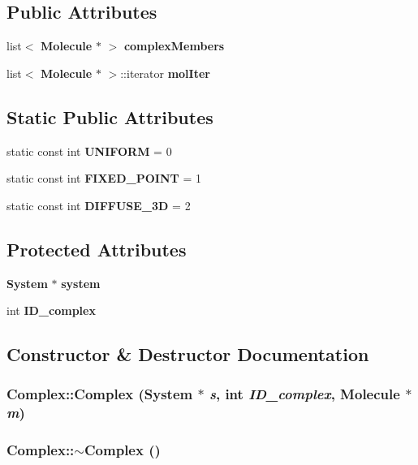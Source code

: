\subsection*{Public Attributes}
\begin{CompactItemize}
\item 
list$<$ {\bf Molecule} $\ast$ $>$ {\bf complexMembers}
\item 
list$<$ {\bf Molecule} $\ast$ $>$::iterator {\bf molIter}
\end{CompactItemize}
\subsection*{Static Public Attributes}
\begin{CompactItemize}
\item 
static const int {\bf UNIFORM} = 0
\item 
static const int {\bf FIXED\_\-POINT} = 1
\item 
static const int {\bf DIFFUSE\_\-3D} = 2
\end{CompactItemize}
\subsection*{Protected Attributes}
\begin{CompactItemize}
\item 
{\bf System} $\ast$ {\bf system}
\item 
int {\bf ID\_\-complex}
\end{CompactItemize}


\subsection{Constructor \& Destructor Documentation}
\subsubsection{\setlength{\rightskip}{0pt plus 5cm}Complex::Complex ({\bf System} $\ast$ {\em s}, int {\em ID\_\-complex}, {\bf Molecule} $\ast$ {\em m})}\label{classNFcore_1_1Complex_f21fb570112128eaf141081404504a67}


\subsubsection{\setlength{\rightskip}{0pt plus 5cm}Complex::$\sim$Complex ()}\label{classNFcore_1_1Complex_70e14b17c92e3da779686b98f9f3bb2d}




